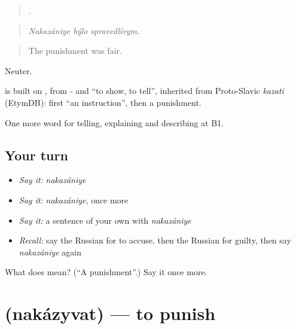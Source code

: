 \begin{quote}
  .
\end{quote}

\begin{quote}
\emph{Nakazániye býlo spravedlívym.}
\end{quote}

\begin{quote}
The punishment was fair.
\end{quote}

Neuter.

\begin{cousinweb}
\emph{} is built on \emph{}, from \emph{-} and \emph{} \textquotedblleft{}to show, to tell\textquotedblright{}, inherited from Proto-Slavic \emph{kazati} (EtymDB): first \textquotedblleft{}an instruction\textquotedblright{}, then a punishment.
\end{cousinweb}

\begin{grammarlens}[title={What you've built}]
One more word for telling, explaining and describing at B1.
\end{grammarlens}

\subsection*{Your turn}
\begin{itemize}
\raggedright
  \item \emph{Say it:} \emph{nakazániye}
  \item \emph{Say it:} \emph{nakazániye}, once more
  \item \emph{Say it:} a sentence of your own with \emph{nakazániye}
  \item \emph{Recall:} say the Russian for to accuse, then the Russian for guilty, then say \emph{nakazániye} again
\end{itemize}

\begin{tcolorbox}[breakable,colback=teal!4,colframe=teal!35!black,title={Before you move on}]
What does  mean? (\textquotedblleft{}A punishment\textquotedblright{}.) Say it once more.
\end{tcolorbox}
\section[\texorpdfstring{\ru{наказывать} (nakázyvat)}{наказывать (nakázyvat)}]{ (nakázyvat) — to punish}

